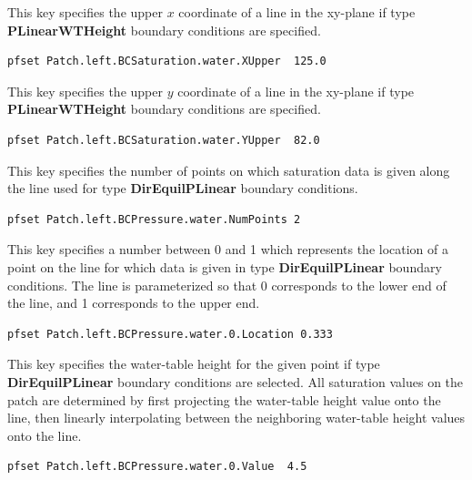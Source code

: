 {
This key specifies the upper $x$ coordinate of a line in the xy-plane if
type {\bf PLinearWTHeight} boundary conditions are specified.
}
\begin{display}\begin{verbatim}
pfset Patch.left.BCSaturation.water.XUpper  125.0
\end{verbatim}\end{display}

{
This key specifies the upper $y$ coordinate of a line in the xy-plane if
type {\bf PLinearWTHeight} boundary conditions are specified.
}
\begin{display}\begin{verbatim}
pfset Patch.left.BCSaturation.water.YUpper  82.0
\end{verbatim}\end{display}

{
This key specifies the number of points on which saturation data is
given along the line used for type {\bf DirEquilPLinear} boundary
conditions.
}
\begin{display}\begin{verbatim}
pfset Patch.left.BCPressure.water.NumPoints 2
\end{verbatim}\end{display}

{
This key specifies a number between 0 and 1 which represents the
location of a point on the line for which data is given in type
{\bf DirEquilPLinear} boundary conditions.  The line is parameterized
so that  0 corresponds to the lower end of the line, and 1 corresponds
to the upper end.
}
\begin{display}\begin{verbatim}
pfset Patch.left.BCPressure.water.0.Location 0.333
\end{verbatim}\end{display}

{
This key specifies the water-table height for the given point if type
{\bf DirEquilPLinear} boundary conditions are selected.  All saturation
values on the patch are determined by first projecting the water-table
height value onto the line, then linearly interpolating between the
neighboring water-table height values onto the line.
}
\begin{display}\begin{verbatim}
pfset Patch.left.BCPressure.water.0.Value  4.5
\end{verbatim}\end{display}

